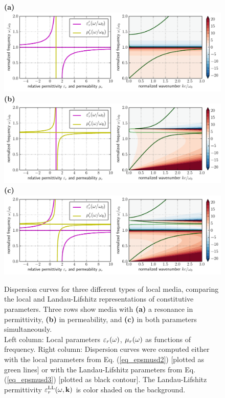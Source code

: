 \begin{figure}[t] \caption{Dispersion curves for three different types of local media, comparing the local and Landau-Lifshitz representations of constitutive parameters. Three rows show media with \textbf{(a)} a  resonance in permittivity, \textbf{(b)} in permeability, and \textbf{(c)} in both parameters simultaneously.\\
Left column: Local parameters $\varepsilon_r(\omega)$, $\mu_r(\omega)$ as functions of frequency. Right column: Dispersion curves were computed either with the local parameters from Eq. (\ref{eq_epsmusd2}) [plotted as green lines] or with the Landau-Lifshitz parameters from Eq. (\ref{eq_epsmusd3}) [plotted as black contour]. The Landau-Lifshitz permittivity $\varepsilon_r^\text{LL}(\omega,{\mathbf{k}})$ is color shaded on the background.
} \label{fg_dcll} \centering  
\textbf{(a)}\\\includegraphics[width=1\textwidth]{img/dispersion_landau_lifshitz/dispersion_ll_el.pdf}    
\textbf{(b)}\\\includegraphics[width=1\textwidth]{img/dispersion_landau_lifshitz/dispersion_ll_mag.pdf}
\textbf{(c)}\\\includegraphics[width=1\textwidth]{img/dispersion_landau_lifshitz/dispersion_ll_elmag.pdf}
\end{figure}
\clearpage
